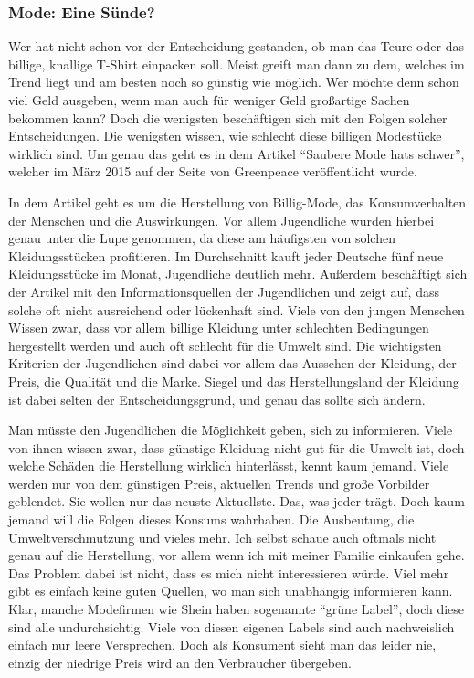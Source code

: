 \subsubsection{Mode: Eine Sünde?}
Wer hat nicht schon vor der Entscheidung gestanden, ob man das Teure oder das billige, knallige T-Shirt einpacken soll. Meist greift man dann zu dem, welches im Trend liegt und am besten noch so günstig wie möglich. Wer möchte denn schon viel Geld ausgeben, wenn man auch für weniger Geld großartige Sachen bekommen kann? Doch die wenigsten beschäftigen sich mit den Folgen solcher Entscheidungen. Die wenigsten wissen, wie schlecht diese billigen Modestücke wirklich sind. Um genau das geht es in dem Artikel “Saubere Mode hats schwer”, welcher im März 2015 auf der Seite von Greenpeace veröffentlicht wurde. 

 

In dem Artikel geht es um die Herstellung von Billig-Mode, das Konsumverhalten der Menschen und die Auswirkungen. Vor allem Jugendliche wurden hierbei genau unter die Lupe genommen, da diese am häufigsten von solchen Kleidungsstücken profitieren. Im Durchschnitt kauft jeder Deutsche fünf neue Kleidungsstücke im Monat, Jugendliche deutlich mehr. Außerdem beschäftigt sich der Artikel mit den Informationsquellen der Jugendlichen und zeigt auf, dass solche oft nicht ausreichend oder lückenhaft sind. Viele von den jungen Menschen Wissen zwar, dass vor allem billige Kleidung unter schlechten Bedingungen hergestellt werden und auch oft schlecht für die Umwelt sind. Die wichtigsten Kriterien der Jugendlichen sind dabei vor allem das Aussehen der Kleidung, der Preis, die Qualität und die Marke. Siegel und das Herstellungsland der Kleidung ist dabei selten der Entscheidungsgrund, und genau das sollte sich ändern.  

 

Man müsste den Jugendlichen die Möglichkeit geben, sich zu informieren. Viele von ihnen wissen zwar, dass günstige Kleidung nicht gut für die Umwelt ist, doch welche Schäden die Herstellung wirklich hinterlässt, kennt kaum jemand. Viele werden nur von dem günstigen Preis, aktuellen Trends und große Vorbilder geblendet. Sie wollen nur das neuste Aktuellste. Das, was jeder trägt. Doch kaum jemand will die Folgen dieses Konsums wahrhaben. Die Ausbeutung, die Umweltverschmutzung und vieles mehr. Ich selbst schaue auch oftmals nicht genau auf die Herstellung, vor allem wenn ich mit meiner Familie einkaufen gehe. Das Problem dabei ist nicht, dass es mich nicht interessieren würde. Viel mehr gibt es einfach keine guten Quellen, wo man sich unabhängig informieren kann. Klar, manche Modefirmen wie Shein haben sogenannte “grüne Label”, doch diese sind alle undurchsichtig. Viele von diesen eigenen Labels sind auch nachweislich einfach nur leere Versprechen. Doch als Konsument sieht man das leider nie, einzig der niedrige Preis wird an den Verbraucher übergeben.  

